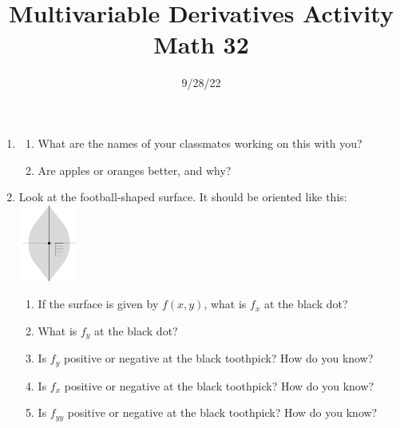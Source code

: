 \documentclass[12pt]{amsart}
\title[Derivatives Activity]{Multivariable Derivatives Activity\\Math 32}
\author[]{9/28/22}
\begin{document}
%

\maketitle

\begin{enumerate}
\item
\begin{enumerate}
\item
What are the names of your classmates working on this with you?

\vspace{0.5in}

\item
Are apples or oranges better, and why?
%
\end{enumerate}

\item
Look at the football-shaped surface.  It should be oriented like this:
\includegraphics[height=1in]{0928-football.png}


\begin{enumerate}
\item
If the surface is given by $f(x,y)$, what  is $f_x$ at the black dot?

\vspace{0.5in}

\item
What is $f_y$ at the black dot?

\vspace{0.5in}

\item
Is $f_y$ positive or negative at the black toothpick?  How do you know?

\vspace{0.5in}

\item
Is $f_x$ positive or negative at the black toothpick?  How do you know?

\vspace{0.5in}

\item
Is $f_{yy}$ positive or negative at the black toothpick?  How do you know?


\end{enumerate}
\end{enumerate}
\end{document}
